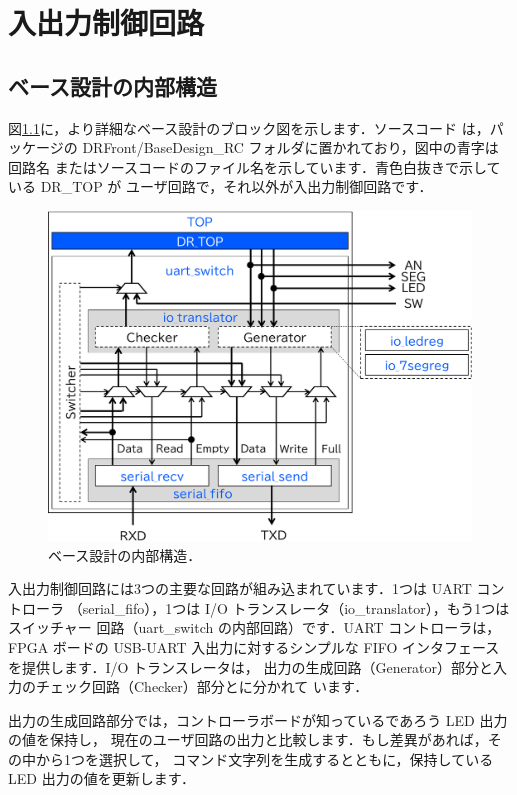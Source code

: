 \chapter{入出力制御回路}

\section{ベース設計の内部構造}

図\ref{fig:iodetail}に，より詳細なベース設計のブロック図を示します．ソースコード
は，パッケージの DRFront/BaseDesign\_RC フォルダに置かれており，図中の青字は回路名
またはソースコードのファイル名を示しています．青色白抜きで示している DR\_TOP が
ユーザ回路で，それ以外が入出力制御回路です．

\begin{figure}[ht]
 \centering
 \includegraphics[width=110truemm]{figs/iodetail.pdf}
 \caption{ベース設計の内部構造．}
 \label{fig:iodetail}
\end{figure}

入出力制御回路には3つの主要な回路が組み込まれています．1つは UART コントローラ
（serial\_fifo），1つは I/O トランスレータ（io\_translator），もう1つはスイッチャー
回路（uart\_switch の内部回路）です．UART コントローラは，FPGA ボードの USB-UART
入出力に対するシンプルな FIFO インタフェースを提供します．I/O トランスレータは，
出力の生成回路（Generator）部分と入力のチェック回路（Checker）部分とに分かれて
います．

出力の生成回路部分では，コントローラボードが知っているであろう LED 出力の値を保持し，
現在のユーザ回路の出力と比較します．もし差異があれば，その中から1つを選択して，
コマンド文字列を生成するとともに，保持している LED 出力の値を更新します．

